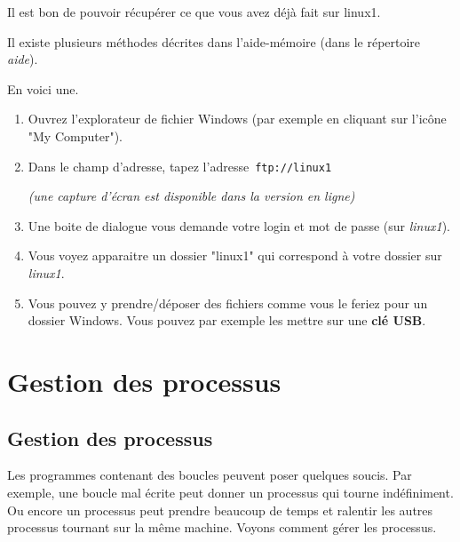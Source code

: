 \documentclass[11pt,a4paper]{article}
\begin{document}
          Il est bon de pouvoir r\'ecup\'erer ce que vous avez d\'ej\`a fait sur linux1. \par
				
          Il existe plusieurs m\'ethodes d\'ecrites dans l'aide-m\'emoire (dans le r\'epertoire \textit{aide}). \par
				
          En voici une.  \par
				
            \par
        
					\begin{enumerate}
				
			\item Ouvrez l'explorateur de fichier Windows (par exemple en cliquant sur l'ic\^one "My Computer").
			\item 
            Dans le champ d'adresse, tapez l'adresse \,\verb|ftp://linux1|\,\par
				 {\footnotesize\emph{(une capture d'\'ecran est disponible dans la version en ligne)}\par} 
			\item Une boite de dialogue vous demande votre login et mot de passe (sur \textit{linux1}).
			\item Vous voyez apparaitre un dossier "linux1" qui correspond \`a votre dossier sur \textit{linux1}. 
			\item 
            Vous pouvez y prendre/d\'eposer des fichiers comme vous le feriez pour un dossier Windows. 
            Vous pouvez par exemple les mettre sur une \textbf{cl\'e USB}.
          
					\end{enumerate}
				\section{Gestion des processus}\subsection{Gestion des processus}
					Les programmes contenant des boucles
					peuvent poser quelques soucis.
					Par exemple, une boucle mal \'ecrite peut
					donner un processus qui tourne
					ind\'efiniment.
					Ou encore un processus peut prendre
					beaucoup de temps et ralentir
					les autres processus
					tournant sur la m\^eme machine.
					Voyons comment g\'erer les processus.
				
            \par
        
\end{document}
